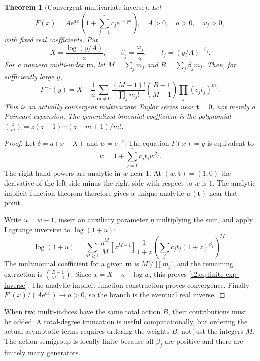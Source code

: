 \documentclass[11pt,openany]{book}
\numberwithin{equation}{chapter}
\theoremstyle{plain}
\newtheorem{theorem}{Theorem}[chapter]
\theoremstyle{definition}
\theoremstyle{remark}
\newcommand{\ee}{\mathrm e}
\begin{document}
\begin{theorem}[Convergent multivariate inverse]
\label{t2:thm:finite-exp}
Let
\begin{equation}
 F(x)=A\ee^{ax}\left(1+\sum_{j=1}^r c_j\ee^{-\omega_jx}\right),
 \quad A>0,\quad a>0,\quad \omega_j>0,
 \label{t2:eq:finite-exp}
\end{equation}
with fixed real coefficients. Put
\[
 X=\frac{\log(y/A)}a,\qquad
 \beta_j=\frac{\omega_j}{a},\qquad
 t_j=(y/A)^{-\beta_j}.
\]
For a nonzero multi-index $\bm m$, let $M=\sum_jm_j$ and
$B=\sum_j\beta_jm_j$. Then, for sufficiently large $y$,
\begin{equation}
 F^{-1}(y)=X-\frac1a
 \sum_{\bm m\ne0}
 \frac{(M-1)!}{\prod_jm_j!}
 \binom{B-1}{M-1}\prod_j(c_jt_j)^{m_j}.
 \label{t2:eq:finite-exp-inverse}
\end{equation}
This is an actually convergent multivariate Taylor series near $\bm t=0$, not merely a Poincar\'e expansion. The generalized binomial coefficient is the polynomial
$\binom{z}{m}=z(z-1)\cdots(z-m+1)/m!$.
\end{theorem}
\begin{proof}
Let $\delta=a(x-X)$ and $w=\ee^{-\delta}$. The equation $F(x)=y$ is equivalent to
\begin{equation}
 w=1+\sum_{j=1}^r c_jt_jw^{\beta_j}.
 \label{t2:eq:w-finite}
\end{equation}
The right-hand powers are analytic in $w$ near $1$. At $(w,\bm t)=(1,0)$ the derivative of the left side minus the right side with respect to $w$ is $1$. The analytic implicit-function theorem therefore gives a unique analytic $w(\bm t)$ near that point.

Write $u=w-1$, insert an auxiliary parameter $\eta$ multiplying the sum, and apply Lagrange inversion to $\log(1+u)$:
\[
 \log(1+u)=\sum_{M\ge1}\frac{\eta^M}{M}
 [z^{M-1}]\frac1{1+z}
       \left(\sum_jc_jt_j(1+z)^{\beta_j}\right)^M.
\]
The multinomial coefficient for a given $\bm m$ is $M!/\prod m_j!$, and the remaining extraction is $\binom{B-1}{M-1}$. Since $x=X-a^{-1}\log w$, this proves \eqref{t2:eq:finite-exp-inverse}. The analytic implicit-function construction proves convergence. Finally $F'(x)/(A\ee^{ax})\to a>0$, so the branch is the eventual real inverse.
\end{proof}

When two multi-indices have the same total action $B$, their contributions must be added. A total-degree truncation is useful computationally, but ordering the actual asymptotic terms requires ordering the weights $B$, not just the integers $M$. The action semigroup is locally finite because all $\beta_j$ are positive and there are finitely many generators.
\end{document}
